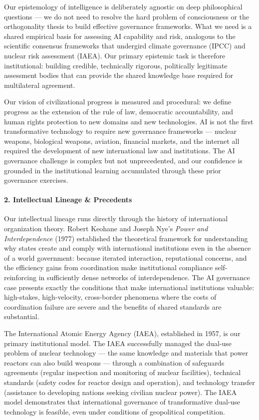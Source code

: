 Our epistemology of intelligence is deliberately agnostic on deep
philosophical questions --- we do not need to resolve the hard problem
of consciousness or the orthogonality thesis to build effective
governance frameworks. What we need is a shared empirical basis for
assessing AI capability and risk, analogous to the scientific consensus
frameworks that undergird climate governance (IPCC) and nuclear risk
assessment (IAEA). Our primary epistemic task is therefore
institutional: building credible, technically rigorous, politically
legitimate assessment bodies that can provide the shared knowledge base
required for multilateral agreement.

Our vision of civilizational progress is measured and procedural: we
define progress as the extension of the rule of law, democratic
accountability, and human rights protection to new domains and new
technologies. AI is not the first transformative technology to require
new governance frameworks --- nuclear weapons, biological weapons,
aviation, financial markets, and the internet all required the
development of new international law and institutions. The AI governance
challenge is complex but not unprecedented, and our confidence is
grounded in the institutional learning accumulated through these prior
governance exercises.

\paragraph{2. Intellectual Lineage \&
Precedents}\label{intellectual-lineage-precedents-4}

Our intellectual lineage runs directly through the history of
international organization theory. Robert Keohane and Joseph Nye's
\emph{Power and Interdependence} (1977) established the theoretical
framework for understanding why states create and comply with
international institutions even in the absence of a world government:
because iterated interaction, reputational concerns, and the efficiency
gains from coordination make institutional compliance self-reinforcing
in sufficiently dense networks of interdependence. The AI governance
case presents exactly the conditions that make international
institutions valuable: high-stakes, high-velocity, cross-border
phenomena where the costs of coordination failure are severe and the
benefits of shared standards are substantial.

The International Atomic Energy Agency (IAEA), established in 1957, is
our primary institutional model. The IAEA successfully managed the
dual-use problem of nuclear technology --- the same knowledge and
materials that power reactors can also build weapons --- through a
combination of safeguards agreements (regular inspection and monitoring
of nuclear facilities), technical standards (safety codes for reactor
design and operation), and technology transfer (assistance to developing
nations seeking civilian nuclear power). The IAEA model demonstrates
that international governance of transformative dual-use technology is
feasible, even under conditions of geopolitical competition.

